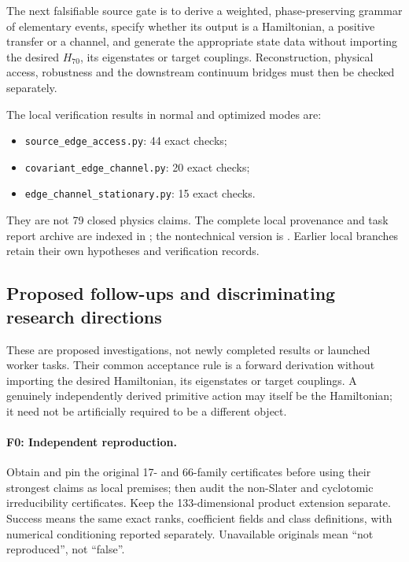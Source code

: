 The next falsifiable source gate is to derive a weighted, phase-preserving
grammar of elementary events, specify whether its output is a Hamiltonian,
a positive transfer or a channel, and generate the appropriate state data
without importing the desired $H_{70}$, its eigenstates or target couplings.
Reconstruction, physical access, robustness and the downstream continuum
bridges must then be checked separately.

The local verification results in normal and optimized modes are:
\begin{itemize}[leftmargin=*]
\item \texttt{source\_edge\_access.py}: 44 exact checks;
\item \texttt{covariant\_edge\_channel.py}: 20 exact checks;
\item \texttt{edge\_channel\_stationary.py}: 15 exact checks.
\end{itemize}
They are not 79 closed physics claims.
The complete local provenance and task report archive are indexed in
; the nontechnical
version is .
Earlier local branches retain their own hypotheses and verification records.

\subsection{Proposed follow-ups and discriminating research directions}
\label{sec:universalraum-followups-20260912}

These are proposed investigations, not newly completed results or launched
worker tasks. Their common acceptance rule is a forward derivation without
importing the desired Hamiltonian, its eigenstates or target couplings.
A genuinely independently derived primitive action may itself be the
Hamiltonian; it need not be artificially required to be a different object.

\paragraph{F0: Independent reproduction.}
Obtain and pin the original 17- and 66-family certificates before using
their strongest claims as local premises; then audit the non-Slater and
cyclotomic irreducibility certificates. Keep the 133-dimensional product
extension separate. Success means the same exact ranks, coefficient fields
and class definitions, with numerical conditioning reported separately.
Unavailable originals mean ``not reproduced'', not ``false''.

